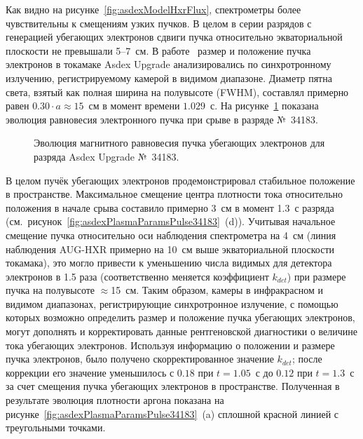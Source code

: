 Как видно на рисунке~\ref{fig:asdexModelHxrFlux}, спектрометры более чувствительны к смещениям узких пучков. В целом в серии разрядов с генерацией убегающих электронов сдвиги пучка относительно экваториальной плоскости не превышали 5--7~см. В работе~\cite{PazSoldan2017} размер и положение пучка электронов в токамаке Asdex Upgrade анализировались по синхротронному излучению, регистрируемому камерой в видимом диапазоне. Диаметр пятна света, взятый как полная ширина на полувысоте (FWHM), составлял примерно равен $0.30 \cdot a \approx 15$~см в момент времени $1.029$~с. На рисунке~\ref{fig:asdexBeamEvolution34183} показана эволюция равновесия электронного пучка при срыве в разряде №~34183.~\cite{Shevelev2021}

\begin{figure}[ht!]
  \caption{ Эволюция магнитного равновесия пучка убегающих электронов для разряда Asdex Upgrade №~34183.~\cite{Shevelev2021} }
  \label{fig:asdexBeamEvolution34183}
\end{figure}

В целом пучёк убегающих электронов продемонстрировал стабильное положение в пространстве. Максимальное смещение центра плотности тока относительно положения в начале срыва составило примерно 3~см в момент 1.3~с разряда (см.~рисунок~\ref{fig:asdexPlasmaParamsPulse34183}~(d)). Учитывая начальное смещение пучка относительно оси наблюдения спектрометра на 4~см (линия наблюдения AUG-HXR примерно на 10~см выше экваториальной плоскости токамака), это могло привести к уменьшению числа видимых для детектора электронов в 1.5 раза (соответственно меняется коэффициент $k_{det}$)  при размере пучка на полувысоте $\approx$15~см. Таким образом, камеры в инфракрасном и видимом диапазонах, регистрирующие синхротронное излучение, с помощью которых возможно определить размер и положение пучка убегающих электронов, могут дополнять и корректировать данные рентгеновской диагностики о величине тока убегающих электронов. Используя информацию о положении и размере пучка электронов, было получено скорректированное значение $k_{det}$; после коррекции его значение уменьшилось с $0.18$ при $t = 1.05$~с до $0.12$ при $t = 1.3$~с за счет смещения пучка убегающих электронов в пространстве. Полученная в результате эволюция плотности аргона показана на рисунке~\ref{fig:asdexPlasmaParamsPulse34183}~(a) сплошной красной линией с треугольными точками.~\cite{Shevelev2021}


